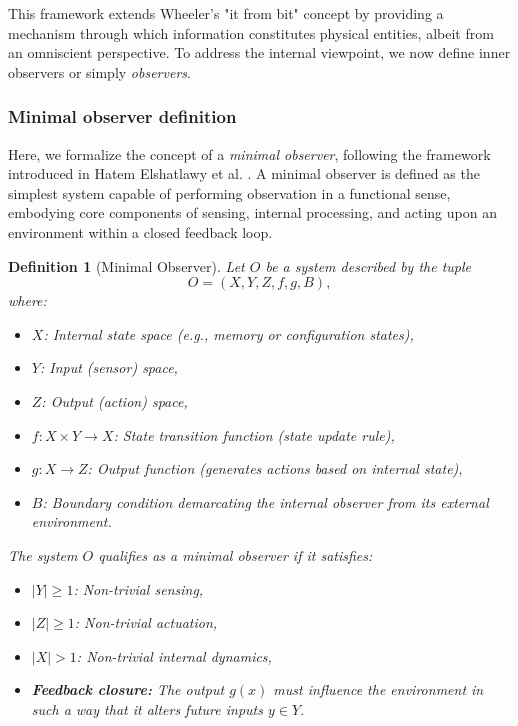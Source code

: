 \documentclass[12pt]{article}
\newtheorem{definition}{Definition}[section]
\begin{document}
This framework extends Wheeler's "it from bit" concept by providing a mechanism through which information constitutes physical entities, albeit from an omniscient perspective. To address the internal viewpoint, we now define inner observers or simply \textit{observers}. 

\subsubsection{Minimal observer definition}

Here, we formalize the concept of a \emph{minimal observer}, following the framework introduced in Hatem Elshatlawy et al. \cite{elshatlawy2025towards}. A minimal observer is defined as the simplest system capable of performing observation in a functional sense, embodying core components of sensing, internal processing, and acting upon an environment within a closed feedback loop.

\begin{definition}[Minimal Observer]
Let $O$ be a system described by the tuple
\[
O = (X, Y, Z, f, g, B),
\]
where:
\begin{itemize}
    \item $X$: Internal state space (e.g., memory or configuration states),
    \item $Y$: Input (sensor) space,
    \item $Z$: Output (action) space,
    \item $f: X \times Y \rightarrow X$: State transition function (state update rule),
    \item $g: X \rightarrow Z$: Output function (generates actions based on internal state),
    \item $B$: Boundary condition demarcating the internal observer from its external environment.
\end{itemize}

The system $O$ qualifies as a \emph{minimal observer} if it satisfies:
\begin{itemize}
    \item $|Y| \geq 1$: Non-trivial sensing,
    \item $|Z| \geq 1$: Non-trivial actuation,
    \item $|X| > 1$: Non-trivial internal dynamics,
    \item \textbf{Feedback closure:} The output $g(x)$ must influence the environment in such a way that it alters future inputs $y \in Y$.
\end{itemize}
\end{definition}
\end{document}

